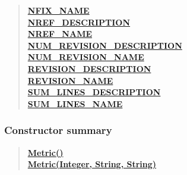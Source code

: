 {{{\begin{verse}
\hyperlink{it.unisa.sesa.repominer.db.entities.Metric.NFIX_NAME}{{\bf NFIX\_NAME}} \\
\hyperlink{it.unisa.sesa.repominer.db.entities.Metric.NREF_DESCRIPTION}{{\bf NREF\_DESCRIPTION}} \\
\hyperlink{it.unisa.sesa.repominer.db.entities.Metric.NREF_NAME}{{\bf NREF\_NAME}} \\
\hyperlink{it.unisa.sesa.repominer.db.entities.Metric.NUM_REVISION_DESCRIPTION}{{\bf NUM\_REVISION\_DESCRIPTION}} \\
\hyperlink{it.unisa.sesa.repominer.db.entities.Metric.NUM_REVISION_NAME}{{\bf NUM\_REVISION\_NAME}} \\
\hyperlink{it.unisa.sesa.repominer.db.entities.Metric.REVISION_DESCRIPTION}{{\bf REVISION\_DESCRIPTION}} \\
\hyperlink{it.unisa.sesa.repominer.db.entities.Metric.REVISION_NAME}{{\bf REVISION\_NAME}} \\
\hyperlink{it.unisa.sesa.repominer.db.entities.Metric.SUM_LINES_DESCRIPTION}{{\bf SUM\_LINES\_DESCRIPTION}} \\
\hyperlink{it.unisa.sesa.repominer.db.entities.Metric.SUM_LINES_NAME}{{\bf SUM\_LINES\_NAME}} \\
\end{verse}
}
\subsubsection{Constructor summary}{
\begin{verse}
\hyperlink{it.unisa.sesa.repominer.db.entities.Metric()}{{\bf Metric()}} \\
\hyperlink{it.unisa.sesa.repominer.db.entities.Metric(java.lang.Integer, java.lang.String, java.lang.String)}{{\bf Metric(Integer, String, String)}} \\
\end{verse}
}
}}
